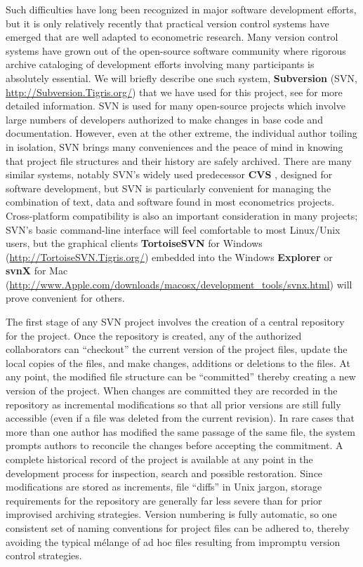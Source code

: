 \documentclass[10pt,a4paper,twoside]{article}
\let\pkg=\textbf
\let\proglang=\textsf
\begin{document}
Such difficulties have long been recognized in major software development
efforts, but it is only relatively recently that practical version control systems
have emerged that are well adapted to econometric research.  Many version control
systems have grown out of the open-source software community where rigorous
archive cataloging of development efforts involving many participants is
absolutely essential.  We will briefly describe one such system,
\pkg{Subversion} (SVN, \url{http://Subversion.Tigris.org/})
that we have used for this project, 
see \cite{repro:Pilato+Collins-Sussman+Fitzpatrick:2004}
for more detailed information. SVN is used for many open-source 
projects which involve large numbers of developers authorized to make
changes in base code and documentation.  However, even at the other extreme,
the individual author toiling in isolation, SVN brings many conveniences and
the peace of mind in knowing that project file structures and their history
are safely archived.
There are many similar systems, notably SVN's widely used predecessor 
\pkg{CVS} \citep{repro:Cederqvist:2006}, designed for software
development, but SVN is particularly convenient for managing the combination of text,
data and software found in most econometrics projects.  Cross-platform
compatibility is also an important consideration in many projects;
SVN's basic command-line interface will feel comfortable to most 
Linux/Unix users, but the graphical clients \pkg{TortoiseSVN} for 
Windows (\url{http://TortoiseSVN.Tigris.org/}) embedded 
into the Windows \pkg{Explorer} or  \pkg{svnX} for 
Mac (\url{http://www.Apple.com/downloads/macosx/development_tools/svnx.html})
will prove convenient for others.

The first stage of any SVN project involves the creation of a central repository
for the project.  Once  the repository is created, any of the authorized collaborators
can ``checkout'' the current version of the project files, update the local copies
of the files, and make changes, additions or deletions to the files.  At any point,
the modified  file structure  can be ``committed'' thereby creating a new version
of the project.  When changes are committed they are recorded in the repository
as incremental modifications so that all prior versions are still fully accessible
(even if a file was deleted from the current revision).
In rare cases that more than one author has modified the same passage of the same
file, the system prompts authors to reconcile the changes before accepting the
commitment.  A complete historical record of the project is available at any point in 
the development process for inspection, search and possible restoration.
Since modifications are stored as increments, file ``diffs'' in Unix jargon,
storage requirements for the repository are generally far less severe than for
prior improvised archiving strategies.  Version numbering is fully automatic,
so one consistent set of naming conventions for project files can be adhered
to, thereby avoiding the typical m\'elange of ad hoc files resulting from impromptu
version control strategies.
\end{document}
